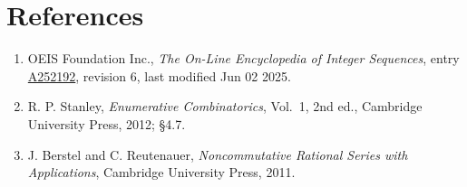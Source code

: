 \documentclass[11pt]{article}
\theoremstyle{definition}
\begin{document}
\section{References}

\begin{enumerate}

\item OEIS Foundation Inc., \emph{The On-Line Encyclopedia of Integer Sequences}, entry \href{https://oeis.org/A252192}{A252192}, revision 6, last modified Jun 02 2025.

\item R. P. Stanley, \emph{Enumerative Combinatorics}, Vol.~1, 2nd ed., Cambridge University Press, 2012; \S4.7.

\item J. Berstel and C. Reutenauer, \emph{Noncommutative Rational Series with Applications}, Cambridge University Press, 2011.

\end{enumerate}
\end{document}
